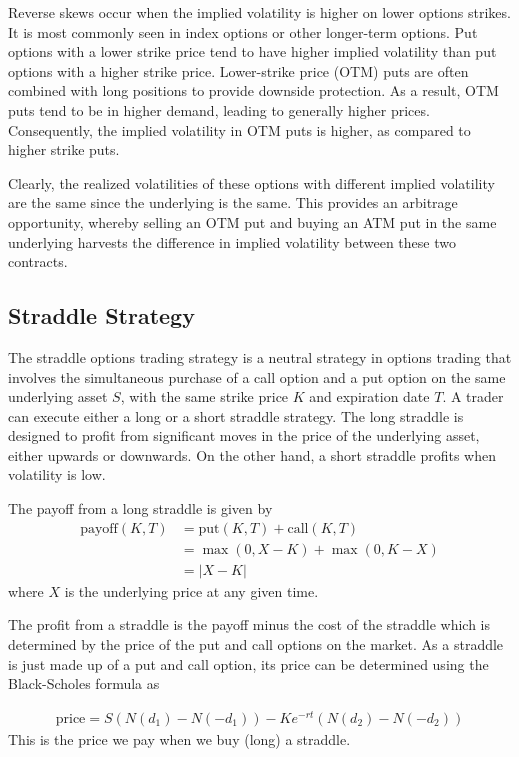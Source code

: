 \documentclass[10pt]{article}
\theoremstyle{definition}
\begin{document}
Reverse skews occur when the implied volatility is higher on lower options strikes. It is most commonly seen in index options or other longer-term options. Put options with a lower strike price tend to have higher implied volatility than put options with a higher strike price. Lower-strike price (OTM) puts are often combined with long positions to provide downside protection. As a result, OTM puts tend to be in higher demand, leading to generally higher prices. Consequently, the implied volatility in OTM puts is higher, as compared to higher strike puts.

Clearly, the realized volatilities of these options with different implied volatility are the same since the underlying is the same. This provides an arbitrage opportunity, whereby selling an OTM put and buying an ATM put in the same underlying harvests the difference in implied volatility between these two contracts.


\subsection{Straddle Strategy}
The straddle options trading strategy is a neutral strategy in options trading that involves the simultaneous purchase of a call option and a put option on the same underlying asset $S$, with the same strike price $K$ and expiration date $T$. A trader can execute either a long or a short straddle strategy. The long straddle is designed to profit from significant moves in the price of the underlying asset, either upwards or downwards. On the other hand, a short straddle profits when volatility is low. 

The payoff from a long straddle is given by
\begin{align*}
    \text{payoff}(K, T) &= \text{put}(K,T) + \text{call}(K,T)\\
    &= \max(0, X-K) + \max(0, K - X)\\
    &= |X - K|
\end{align*}
where $X$ is the underlying price at any given time. 

The profit from a straddle is the payoff minus the cost of the straddle which is determined by the price of the put and call options on the market. As a straddle is just made up of a put and call option, its price can be determined using the Black-Scholes formula as

\begin{align*}
    \text{price} = S(N(d_1) - N(-d_1)) - Ke^{-rt}(N(d_2) - N(-d_2))
\end{align*}
This is the price we pay when we buy (long) a straddle. 
\end{document}
